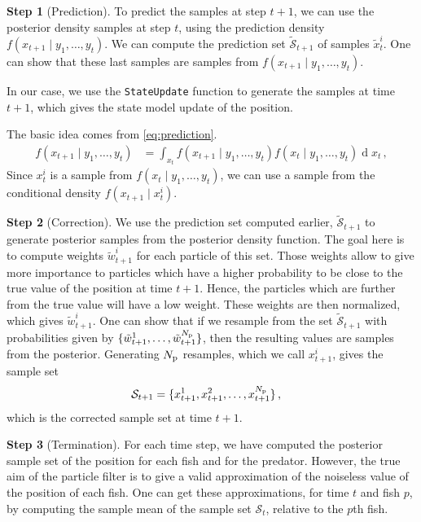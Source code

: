 \documentclass[final]{aomart}
\newtheorem[{}\it]{thm}{Theorem}[section]
\theoremstyle{definition}
\newtheorem*[{}\it]{notation}{Notation}
\newtheorem{step}{Step}
\numberwithin{equation}{section}
\newcommand{\np}{N_\textnormal{p}}
\newcommand{\sset}{\mathcal{S}}
\newcommand{\pdf}{f} %
\DeclareMathOperator{\newdiff}{d} %
\newcommand{\dif}{\newdiff\!} %
\begin{document}
\begin{step}[Prediction]
To predict the samples at step \(t+1\), we can use the posterior density samples at step \(t\), using the prediction density \(\pdf(x_{t+1} \mid y_1,\ldots,y_t)\).
We can compute the prediction set \(\tilde{\sset}_{t+1}\) of samples \(\tilde{x}_t^i \).
One can show that these last samples are samples from \(\pdf(x_{t+1} \mid y_1,\ldots,y_t)\). \cite{anuj ref 5}

In our case, we use the \texttt{StateUpdate} function to generate the samples at time \(t+1\), which gives the state model update of the position.

The basic idea comes from \eqref{eq:prediction}.
\begin{align}
	\pdf(x_{t+1} \mid y_1, \ldots, y_t) &= \int_{x_t}  \pdf(x_{t+1} \mid y_1, \ldots, y_t) \pdf(x_t \mid y_1,\ldots,y_t) \dif x_t\,,
	\label{eq:prediction}
\end{align}
Since \(x_t^i\) is a sample from \(\pdf(x_t \mid y_1, \ldots, y_t)\), we can use a sample from the conditional density \(\pdf(x_{t+1} \mid x_t^i)\).
\end{step}

\begin{step}[Correction]
We use the prediction set computed earlier, \(\tilde{\sset}_{t+1}\) to generate posterior samples from the posterior density function.
The goal here is to compute weights \( \tilde{w}_{t+1}^i \) for each particle of this set.
Those weights allow to give more importance to particles which have a higher probability to be close to the true value of the position at time \(t+1\).
Hence, the particles which are further from the true value will have a low weight.
These weights are then normalized, which gives \(\tilde{w}_{t+1}^i\).
One can show that if we resample from the set \(\tilde{\sset}_{t+1}\) with probabilities given by \( \{ \tilde{w}_{t+1}^1, \ldots, \tilde{w}_{t+1}^{\np} \} \), then the resulting values are samples from the posterior.
Generating \(\np\) resamples, which we call \(x_{t+1}^i\), gives the sample set
\begin{align}
	\sset_{t+1} &= \{ x_{t+1}^1, x_{t+1}^2, \ldots ,x_{t+1}^{\np} \}\,,
\end{align}
which is the corrected sample set at time \( t+1 \).
\end{step}

\begin{step}[Termination]
For each time step, we have computed the posterior sample set of the position for each fish and for the predator.
However, the true aim of the particle filter is to give a valid approximation of the noiseless value of the position of each fish.
One can get these approximations, for time \(t\) and fish \(p\), by computing the sample mean of the sample set \(\sset_{t}\), relative to the \(p\)th fish.
\end{step}
\end{document}
